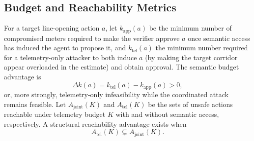\documentclass{ieeeaccess}
\begin{document}
\subsection{Budget and Reachability Metrics}
For a target line-opening action $a$, let $k_{\mathrm{app}}(a)$ be the minimum number of compromised meters required to make the verifier approve $a$ once semantic access has induced the agent to propose it, and $k_{\mathrm{tel}}(a)$ the minimum number required for a telemetry-only attacker to both induce $a$ (by making the target corridor appear overloaded in the estimate) and obtain approval. The semantic budget advantage is
\begin{equation}
\Delta k(a) = k_{\mathrm{tel}}(a) - k_{\mathrm{app}}(a) > 0,
\end{equation}
or, more strongly, telemetry-only infeasibility while the coordinated attack remains feasible. Let $A_{\mathrm{joint}}(K)$ and $A_{\mathrm{tel}}(K)$ be the sets of unsafe actions reachable under telemetry budget $K$ with and without semantic access, respectively. A structural reachability advantage exists when
\begin{equation}
A_{\mathrm{tel}}(K) \subsetneq A_{\mathrm{joint}}(K).
\end{equation}
\end{document}
